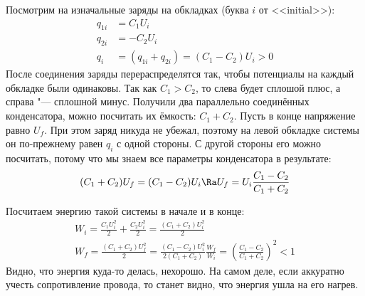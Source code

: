     Посмотрим на изначальные заряды на обкладках (буква $i$ от <<initial>>):
    \begin{align*}
      q_{1i} &= C_1 U_i \\
      q_{2i} &= -C_2 U_i \\
      q_i &= (q_{1i}+q_{2i}) = (C_1-C_2) U_i > 0
    \end{align*}
    После соединения заряды перераспределятся так, чтобы потенциалы на каждый обкладке были одинаковы.
    Так как $C_1>C_2$, то слева будет сплошой плюс, а справа "--- сплошной минус.
    Получили два параллельно соединённых конденсатора, можно посчитать их ёмкость: $C_1+C_2$.
    Пусть в конце напряжение равно $U_f$.
    При этом заряд никуда не убежал, поэтому на левой обкладке системы он по-прежнему равен $q_i$ с одной стороны.
    С другой стороны его можно посчитать, потому что мы знаем все параметры конденсатора в результате:
    \[ (C_1+C_2)U_f = (C_1-C_2)U_i \Ra U_f = U_i\frac{C_1-C_2}{C_1+C_2}\]

    Посчитаем энергию такой системы в начале и в конце:
    \begin{gather*}
    W_i = \frac{C_1U_i^2}{2} + \frac{C_2U_i^2}{2} = \frac{(C_1+C_2)U_i^2}{2} \\
    W_f = \frac{(C_1+C_2)U_f^2}{2} = \frac{(C_1-C_2)U_i^2}{2(C_1+C_2)}
    \frac{W_f}{W_i} = \left(\frac{C_1-C_2}{C_1+C_2}\right)^2 < 1
    \end{gather*}
    Видно, что энергия куда-то делась, нехорошо.
    На самом деле, если аккуратно учесть сопротивление провода, то станет видно, что энергия ушла на его нагрев.
